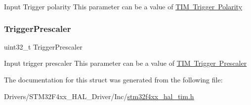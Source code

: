 Input Trigger polarity This parameter can be a value of \mbox{\hyperlink{group___t_i_m___trigger___polarity}{T\+IM Trigger Polarity}} \mbox{\label{struct_t_i_m___slave_config_type_def_aa2906798e3808ed40ac203a741512b55}} 
\subsubsection{\texorpdfstring{Trigger\+Prescaler}{TriggerPrescaler}}
{\footnotesize\ttfamily uint32\+\_\+t Trigger\+Prescaler}

Input trigger prescaler This parameter can be a value of \mbox{\hyperlink{group___t_i_m___trigger___prescaler}{T\+IM Trigger Prescaler}} 

The documentation for this struct was generated from the following file\+:\begin{DoxyCompactItemize}
\item 
Drivers/\+S\+T\+M32\+F4xx\+\_\+\+H\+A\+L\+\_\+\+Driver/\+Inc/\mbox{\hyperlink{stm32f4xx__hal__tim_8h}{stm32f4xx\+\_\+hal\+\_\+tim.\+h}}\end{DoxyCompactItemize}
